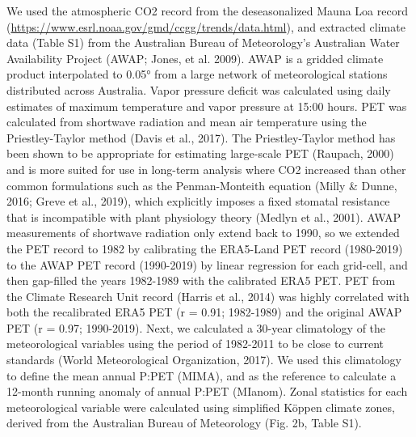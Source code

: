 \documentclass[gc, manuscript]{copernicus}
\begin{document}
We used the atmospheric CO2 record from the deseasonalized Mauna Loa
record (\url{https://www.esrl.noaa.gov/gmd/ccgg/trends/data.html}), and
extracted climate data (Table S1) from the Australian Bureau of
Meteorology's Australian Water Availability Project (AWAP; Jones, et al.
2009). AWAP is a gridded climate product interpolated to 0.05° from a
large network of meteorological stations distributed across Australia.
Vapor pressure deficit was calculated using daily estimates of maximum
temperature and vapor pressure at 15:00 hours. PET was calculated from
shortwave radiation and mean air temperature using the Priestley-Taylor
method (Davis et al., 2017). The Priestley-Taylor method has been shown
to be appropriate for estimating large-scale PET (Raupach, 2000) and is
more suited for use in long-term analysis where CO2 increased than other
common formulations such as the Penman-Monteith equation (Milly \&
Dunne, 2016; Greve et al., 2019), which explicitly imposes a fixed
stomatal resistance that is incompatible with plant physiology theory
(Medlyn et al., 2001). AWAP measurements of shortwave radiation only
extend back to 1990, so we extended the PET record to 1982 by
calibrating the ERA5-Land PET record (1980-2019) to the AWAP PET record
(1990-2019) by linear regression for each grid-cell, and then gap-filled
the years 1982-1989 with the calibrated ERA5 PET. PET from the Climate
Research Unit record (Harris et al., 2014) was highly correlated with
both the recalibrated ERA5 PET (r = 0.91; 1982-1989) and the original
AWAP PET (r = 0.97; 1990-2019). Next, we calculated a 30-year
climatology of the meteorological variables using the period of
1982-2011 to be close to current standards (World Meteorological
Organization, 2017). We used this climatology to define the mean annual
P:PET (MIMA), and as the reference to calculate a 12-month running
anomaly of annual P:PET (MIanom). Zonal statistics for each
meteorological variable were calculated using simplified Köppen climate
zones, derived from the Australian Bureau of Meteorology (Fig. 2b, Table
S1).
\end{document}
